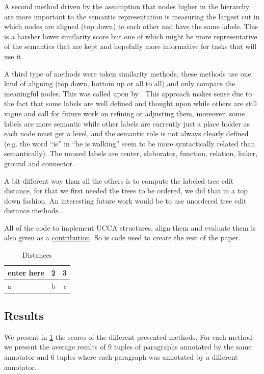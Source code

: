 \documentclass[english]{article}
\begin{document}
{A second method driven by the assumption that nodes higher in the
hierarchy are more important to the semantic representation is measuring
the largest cut in which nodes are aligned (top down) to each other
and have the same labels. This is a harsher lower similarity
score but one of which might be more representative of the semantics
that are kept and hopefully more informative for tasks that will use
it.

A third type of methods were token similarity methods, these methods
use one kind of aligning (top down, bottom up or all to all) and only
compare the meaningful nodes. This was called upon by \cite{sulem2015conceptual}. 
This approach makes sense due to the fact that some labels
are well defined and thought upon while others are still vague and
call for future work on refining or adjusting them, moreover, some
labels are more semantic while other labels are currently just a place
holder as each node must get a level, and the semantic role is not
always clearly defined (e.g. the word ``is'' in ``he is walking''
seem to be more syntactically related than semantically). The unused
labels are center, elaborator, function, relation, linker, ground
and connector.

A bit different way than all the others is to compute the labeled
tree edit distance\cite{zhang1989simple}, for that we first needed
the trees to be ordered, we did that in a top down fashion. An interesting
future work would be to use unordered tree edit distance methods\cite{zhang1992editing}.

All of the code to implement UCCA structures, align them and evaluate
them is also given as a \href{https://github.com/borgr/assess_learner_language}{contribution}.
So is code used to create the rest of the paper.
\begin{table}[h!]
	\centering
	\caption{Distances}
	\label{tab:Distances}
	\begin{tabular}{l|c||r}
		enter here & 2 & 3\\
		\hline
		a & b & c\\
		\end{tabular}
		\end{table}
		
	\subsection{Results}
	
	We present in \ref{tab:Distances} the scores of the different presented
	methods. For each method we present the average results of 9 tuples
	of paragraphs annotated by the same annotator and 6 tuples where each
	paragraph was annotated by a different annotator.
	
}
\end{document}
